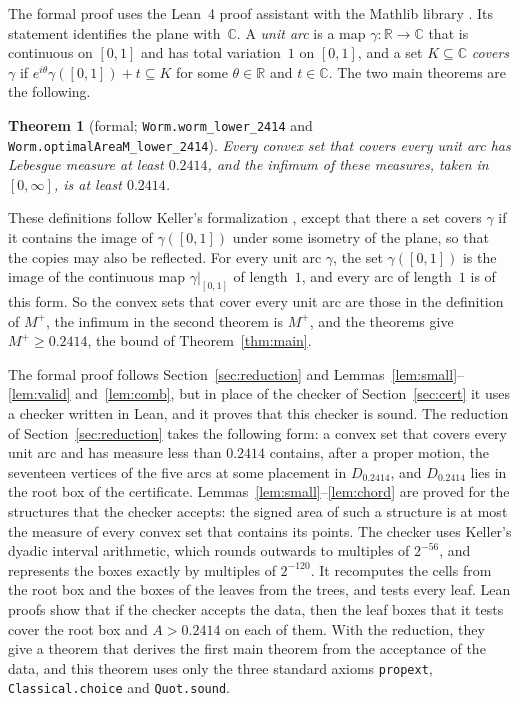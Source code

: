 \documentclass[11pt]{amsart}
\newtheorem{theorem}{Theorem}[section]
\theoremstyle{definition}
\theoremstyle{remark}
\numberwithin{equation}{section}
\newcommand{\R}{\mathbb{R}}
\newcommand{\Mp}{M^{+}}
\newcommand{\TAU}{0.2414}
\newcommand{\LEANTAU}{\TAU}
\newcommand{\LEANWEAKER}{, the bound of Theorem~\ref{thm:main}}
\newcommand{\leanStd}{\texttt{propext}, \texttt{Classical.choice} and \texttt{Quot.sound}}
\begin{document}
The formal proof uses the Lean~4 proof assistant \cite{Lean4} with the Mathlib library \cite{Mathlib}. Its statement identifies the plane with~$\mathbb{C}$. A \emph{unit arc} is a map $\gamma\colon\R\to\mathbb{C}$ that is continuous on $[0,1]$ and has total variation~$1$ on $[0,1]$, and a set $K\subseteq\mathbb{C}$ \emph{covers} $\gamma$ if $e^{i\theta}\gamma([0,1])+t\subseteq K$ for some $\theta\in\R$ and $t\in\mathbb{C}$. The two main theorems are the following.
\begin{theorem}[formal; \texttt{Worm.worm\_lower\_2414} and \texttt{Worm.optimalAreaM\_lower\_2414}]\label{thm:formal}
Every convex set that covers every unit arc has Lebesgue measure at least $\LEANTAU$, and the infimum of these measures, taken in $[0,\infty]$, is at least $\LEANTAU$.
\end{theorem}
 These definitions follow Keller's formalization \cite{KelLean}, except that there a set covers $\gamma$ if it contains the image of $\gamma([0,1])$ under some isometry of the plane, so that the copies may also be reflected. For every unit arc $\gamma$, the set $\gamma([0,1])$ is the image of the continuous map $\gamma|_{[0,1]}$ of length~$1$, and every arc of length~$1$ is of this form. So the convex sets that cover every unit arc are those in the definition of $\Mp$, the infimum in the second theorem is $\Mp$, and the theorems give $\Mp\ge\LEANTAU$\LEANWEAKER.

The formal proof follows Section~\ref{sec:reduction} and Lemmas~\ref{lem:small}--\ref{lem:valid} and~\ref{lem:comb}, but in place of the checker of Section~\ref{sec:cert} it uses a checker written in Lean, and it proves that this checker is sound. The reduction of Section~\ref{sec:reduction} takes the following form: a convex set that covers every unit arc and has measure less than $\LEANTAU$ contains, after a proper motion, the seventeen vertices of the five arcs at some placement in $D_{\LEANTAU}$, and $D_{\LEANTAU}$ lies in the root box of the certificate. Lemmas~\ref{lem:small}--\ref{lem:chord} are proved for the structures that the checker accepts: the signed area of such a structure is at most the measure of every convex set that contains its points. The checker uses Keller's dyadic interval arithmetic, which rounds outwards to multiples of $2^{-56}$, and represents the boxes exactly by multiples of $2^{-120}$. It recomputes the cells from the root box and the boxes of the leaves from the trees, and tests every leaf. Lean proofs show that if the checker accepts the data, then the leaf boxes that it tests cover the root box and $A>\LEANTAU$ on each of them. With the reduction, they give a theorem that derives the first main theorem from the acceptance of the data, and this theorem uses only the three standard axioms \leanStd.
\end{document}
